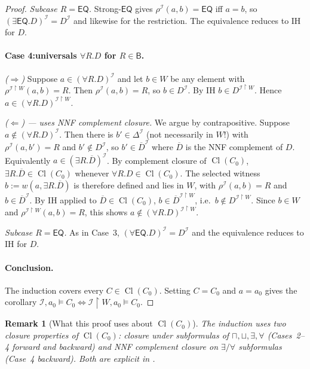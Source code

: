 \documentclass[11pt]{article}
\newtheorem{remark}[theorem]{Remark}
\newcommand{\Cl}{\operatorname{Cl}}
\newcommand{\EQ}{\mathsf{EQ}}
\newcommand{\Base}{\mathsf{B}}
\newcommand{\I}{\mathcal{I}}
\begin{document}
\begin{proof}
\emph{Subcase \(R = \EQ\).}  Strong-\(\EQ\) gives \(\rho^\I(a, b) = \EQ\)
iff \(a = b\), so \((\exists \EQ.D)^\I = D^\I\) and likewise for the
restriction.  The equivalence reduces to IH for \(D\).

\paragraph{Case 4:\@ universals \(\forall R.D\) for \(R \in \Base\).}
\emph{(\(\Rightarrow\))} Suppose \(a \in (\forall R.D)^\I\) and let
\(b \in W\) be any element with
\(\rho^{\I \restriction W}(a, b) = R\).  Then \(\rho^\I(a, b) = R\),
so \(b \in D^\I\).  By IH \(b \in D^{\I \restriction W}\).  Hence
\(a \in (\forall R.D)^{\I \restriction W}\).

\emph{(\(\Leftarrow\)) — uses NNF complement closure.}  We argue by
contrapositive.  Suppose \(a \notin (\forall R.D)^\I\).  Then there is
\(b' \in \Delta^\I\) (not necessarily in \(W\)!) with \(\rho^\I(a, b') = R\)
and \(b' \notin D^\I\), so \(b' \in \overline{D}^\I\) where
\(\overline{D}\) is the NNF complement of \(D\).  Equivalently
\(a \in (\exists R.\overline{D})^\I\).  By complement closure of
\(\Cl(C_0)\),
\(\exists R.\overline{D} \in \Cl(C_0)\) whenever
\(\forall R.D \in \Cl(C_0)\).  The selected witness
\(b := w(a, \exists R.\overline{D})\) is therefore defined and lies in
\(W\), with \(\rho^\I(a, b) = R\) and \(b \in \overline{D}^\I\).
By IH applied to \(\overline{D} \in \Cl(C_0)\),
\(b \in \overline{D}^{\I \restriction W}\), i.e.\
\(b \notin D^{\I \restriction W}\).  Since \(b \in W\) and
\(\rho^{\I \restriction W}(a, b) = R\), this shows
\(a \notin (\forall R.D)^{\I \restriction W}\).

\emph{Subcase \(R = \EQ\).}  As in Case~3, \((\forall \EQ.D)^\I = D^\I\)
and the equivalence reduces to IH for \(D\).

\paragraph{Conclusion.}  The induction covers every \(C \in \Cl(C_0)\).
Setting \(C = C_0\) and \(a = a_0\) gives the corollary
\(\I, a_0 \models C_0 \Longleftrightarrow
\I \restriction W, a_0 \models C_0\).
\end{proof}

\begin{remark}[What this proof uses about \(\Cl(C_0)\)]
The induction uses two closure properties of \(\Cl(C_0)\):\@
closure under subformulas of \(\sqcap, \sqcup, \exists, \forall\)
(Cases~2--4 forward and backward) and \emph{NNF complement closure}
on \(\exists/\forall\) subformulas (Case~4 backward).  Both are
explicit in \cite[Def.~3.4]{repaired}.
\end{remark}
\end{document}
